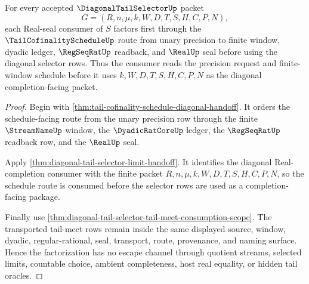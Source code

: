 \begin{theorem}
\label{thm:diagonal-tail-selector-tail-cofinality-factorization}
For every accepted $\DiagonalTailSelectorUp$ packet
$$
G=(R,n,\mu,k,W,D,T,S,H,C,P,N),
$$
each Real-seal consumer of $S$ factors first through the $\TailCofinalityScheduleUp$ route from unary precision to finite window, dyadic ledger, $\RegSeqRatUp$ readback, and $\RealUp$ seal before using the diagonal selector rows. Thus the consumer reads the precision request and finite-window schedule before it uses $k,W,D,T,S,H,C,P,N$ as the diagonal completion-facing packet.
\end{theorem}
\begin{proof}
Begin with \autoref{thm:tail-cofinality-schedule-diagonal-handoff}. It orders the schedule-facing route from the unary precision row through the finite $\StreamNameUp$ window, the $\DyadicRatCoreUp$ ledger, the $\RegSeqRatUp$ readback row, and the $\RealUp$ seal.

Apply \autoref{thm:diagonal-tail-selector-limit-handoff}. It identifies the diagonal Real-completion consumer with the finite packet $R,n,\mu,k,W,D,T,S,H,C,P,N$, so the schedule route is consumed before the selector rows are used as a completion-facing package.

Finally use \autoref{thm:diagonal-tail-selector-tail-meet-consumption-scope}. The transported tail-meet rows remain inside the same displayed source, window, dyadic, regular-rational, seal, transport, route, provenance, and naming surface. Hence the factorization has no escape channel through quotient streams, selected limits, countable choice, ambient completeness, host real equality, or hidden tail oracles.
\end{proof}

